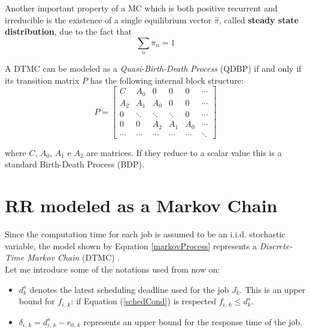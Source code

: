 Another important property of a MC which is both positive recurrent and irreducible is the existence of a single equilibrium vector \( \overset{\sim}{\pi} \), called \textbf{steady state distribution}, due to the fact that
\begin{equation*}
  \displaystyle\sum_{n} \pi_{n} = 1
\end{equation*}

A DTMC can be modeled as a \emph{Quasi-Birth-Death Process} (QDBP) \cite{nummethods} if and only if its transition matrix \( P \) has the following internal block structure:
\begin{equation*} \label{transitionmatrix}
  P = 
  \begin{bmatrix}
    C & A_{0} & 0 & 0 & 0 & \cdots \\
    A_{2} & A_{1} & A_{0} & 0 & 0 & \cdots \\
    0 & \ddots & \ddots & \ddots & 0 & \cdots \\
    0 & 0 & A_{2} & A_{1} & A_{0} & \cdots \\
    \cdots & \cdots & \cdots & \cdots & \cdots & \ddots
  \end{bmatrix}
\end{equation*}

where \( C \), \( A_{0} \), \( A_{1} \) e \( A_{2} \) are matrices. If they reduce to a scalar value this is a standard Birth-Death Process (BDP).

\section{RR modeled as a Markov Chain}
Since the computation time for each job is assumed to be an i.i.d. stochastic variable, the model shown by Equation \ref{markovProcess} represents a \emph{Discrete-Time Markov Chain} (DTMC) \cite{stochasticanalysis}.\\
Let me introduce some of the notations used from now on:
\begin{itemize}
  \item \( d_{k}^{s} \) denotes the latest scheduling deadline used for the job \( J_{k} \). This is an upper bound for \( f_{i,\,k} \): if Equation (\ref{schedCond}) is respected \( f_{i,\,k} \leq d_{k}^{s} \).
  \item \( \delta_{i,\,k} = d_{i,\,k}^{s} - r_{0,\,k} \) represents an upper bound for the response time of the job.
\end{itemize}

